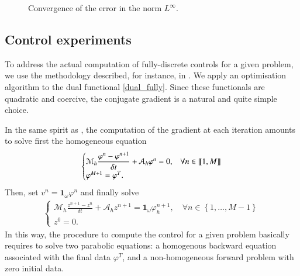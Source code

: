\begin{figure}
\centering
\caption{Convergence of the error in the norm $L^\infty$.}
\end{figure}

\subsection{Control experiments}
%
To address the actual computation of fully-discrete controls for a given problem, we use the methodology described, for instance, in \cite{}. We apply an optimisation algorithm to the dual functional \eqref{dual_fully}. Since these functionals are quadratic and coercive, the conjugate gradient is a natural and quite simple choice.

In the same spirit as \cite{}, the computation of the gradient at each iteration amounts to solve first the homogeneous equation 
%
\begin{align}
	\begin{cases}
		\displaystyle\mathcal M_h \frac{\varphi^n-\varphi^{n+1}}{\delta t}+\mathcal A_h \varphi^n=0, & \forall n\in\llbracket 1,M\rrbracket
		\\
		\varphi^{M+1}=\varphi^T. 
	\end{cases}
\end{align}
%
Then, set $v^n=\mathbf{1}_\omega\varphi^n$ and finally solve 
%
\begin{align}\label{frac_heat_num}
	\begin{cases}
		\displaystyle\mathcal M_h \frac{z^{n+1}-z^n}{\delta t}+\mathcal A_h z^{n+1}=\mathbf{1}_\omega \varphi_h^{n+1}, \quad \forall n\in \left\{1,\ldots,M-1\right\}
		\\
		z^0=0. 
	\end{cases}
\end{align}
%
In this way, the procedure to compute the control for a given problem basically requires to solve two parabolic equations: a homogenous backward equation associated with the final data $\varphi^T$, and a non-homogeneous forward problem with zero initial data. 

